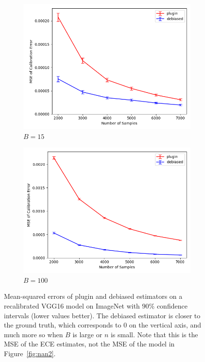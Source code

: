 \begin{figure}
  \centering
  \centering
     \begin{subfigure}[b]{0.45\textwidth}
         \centering
         \includegraphics[width=\textwidth]{images/imnet_scaling_ece_curve_15.png}
         \caption{$B = 15$
         }
     \end{subfigure}
     \hfill
     \begin{subfigure}[b]{0.45\textwidth}
         \centering
         \includegraphics[width=\textwidth]{images/imnet_scaling_ece_curve_100.png}
         \caption{$B = 100$
         }
     \end{subfigure}
  \caption{
    Mean-squared errors of plugin and debiased estimators on a recalibrated VGG16 model on ImageNet with $90\%$ confidence intervals (lower values better). The debiased estimator is closer to the ground truth, which corresponds to $0$ on the vertical axis, and much more so when $B$ is large or $n$ is small.
    Note that this is the MSE of the ECE estimates, not the MSE of the model in Figure~\ref{fig:nan2}.
}
  \label{fig:mse_estimators_imagenet_ece_bins}
\end{figure}

